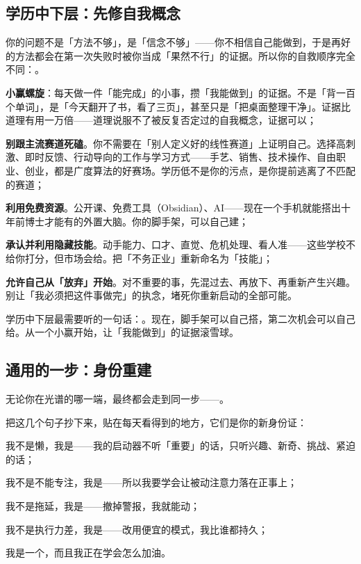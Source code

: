 \subsection{学历中下层：先修自我概念}

你的问题不是「方法不够」，是「信念不够」——你不相信自己能做到，于是再好的方法都会在第一次失败时被你当成「果然不行」的证据。所以你的自救顺序完全不同：。

\begin{checklist}
  \item \textbf{小赢螺旋}：每天做一件「能完成」的小事，攒「我能做到」的证据。不是「背一百个单词」，是「今天翻开了书，看了三页」，甚至只是「把桌面整理干净」。证据比道理有用一万倍——道理说服不了被反复否定过的自我概念，证据可以；
  \item \textbf{别跟主流赛道死磕}。你不需要在「别人定义好的线性赛道」上证明自己。选择高刺激、即时反馈、行动导向的工作与学习方式——手艺、销售、技术操作、自由职业、创业，都是广度算法的好赛场。学历低不是你的污点，是你提前逃离了不匹配的赛道；
  \item \textbf{利用免费资源}。公开课、免费工具（Obsidian）、AI——现在一个手机就能搭出十年前博士才能有的外置大脑。你的脚手架，可以自己建；
  \item \textbf{承认并利用隐藏技能}。动手能力、口才、直觉、危机处理、看人准——这些学校不给你打分，但市场会给。把「不务正业」重新命名为「技能」；
  \item \textbf{允许自己从「放弃」开始}。对不重要的事，先混过去、再放下、再重新产生兴趣。别让「我必须把这件事做完」的执念，堵死你重新启动的全部可能。
\end{checklist}

\begin{insight}
学历中下层最需要听的一句话：。现在，脚手架可以自己搭，第二次机会可以自己给。从一个小赢开始，让「我能做到」的证据滚雪球。
\end{insight}

\subsection{通用的一步：身份重建}

无论你在光谱的哪一端，最终都会走到同一步——。

把这几个句子抄下来，贴在每天看得到的地方，它们是你的新身份证：

\begin{checklist}
  \item 我不是懒，我是——我的启动器不听「重要」的话，只听兴趣、新奇、挑战、紧迫的话；
  \item 我不是不能专注，我是——所以我要学会让被动注意力落在正事上；
  \item 我不是拖延，我是——撤掉警报，我就能动；
  \item 我不是执行力差，我是——改用便宜的模式，我比谁都持久；
  \item 我是一个，而且我正在学会怎么加油。
\end{checklist}

